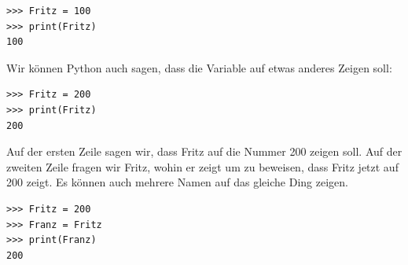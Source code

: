 \begin{Verbatim}[frame=single]
>>> Fritz = 100
>>> print(Fritz)
100
\end{Verbatim}
Wir können Python auch sagen, dass die Variable  auf etwas anderes Zeigen soll:

\begin{Verbatim}[frame=single]
>>> Fritz = 200
>>> print(Fritz)
200
\end{Verbatim}

\noindent
Auf der ersten Zeile sagen wir, dass Fritz auf die Nummer 200 zeigen soll. Auf der zweiten Zeile fragen wir Fritz, wohin er zeigt um zu beweisen, dass Fritz jetzt auf 200 zeigt. Es können auch mehrere Namen auf das gleiche Ding zeigen.

\begin{Verbatim}[frame=single]
>>> Fritz = 200
>>> Franz = Fritz
>>> print(Franz)
200
\end{Verbatim}

